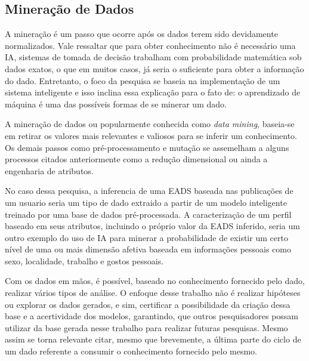 \subsection{Mineração de Dados}
A mineração é um passo que ocorre após os dados terem sido devidamente normalizados. Vale ressaltar que para obter conhecimento não é necessário uma IA, sistemas de tomada de decisão trabalham com probabilidade matemática sob dados exatos, o que em muitos casos, já seria o suficiente para obter a informação do dado. Entretanto, o foco da pesquisa se baseia na implementação de um sistema inteligente e isso inclina essa explicação para o fato de: o aprendizado de máquina é uma das possíveis formas de se minerar um dado.

A mineração de dados ou popularmente conhecida como \textit{data mining}, baseia-se em retirar os valores mais relevantes e valiosos para se inferir um conhecimento. Os demais passos como pré-processamento e mutação se assemelham a alguns processos citados anteriormente como a redução dimensional ou ainda a engenharia de atributos.

No caso dessa pesquisa, a inferencia de uma EADS baseada nas publicações de um usuario seria um tipo de dado extraido a partir de um modelo inteligente treinado por uma base de dados pré-processada. A caracterização de um perfil baseado em seus atributos, incluindo o próprio valor da EADS inferido, seria um outro exemplo do uso de IA para minerar a probabilidade de existir um certo nível de uma ou mais dimensão afetiva baseada em informações pessoais como sexo, localidade, trabalho e gostos pessoais.

Com os dados em mãos, é possível, baseado no conhecimento fornecido pelo dado, realizar vários tipos de análise. O enfoque desse trabalho não é realizar hipóteses ou explorar os dados gerados, e sim, certificar a possibilidade da criação dessa base e a acertividade dos modelos, garantindo, que outros pesquisadores possam utilizar da base gerada nesse trabalho para realizar futuras pesquisas. Mesmo assim se torna relevante citar, mesmo que brevemente, a última parte do ciclo de um dado referente a consumir o conhecimento fornecido pelo mesmo.